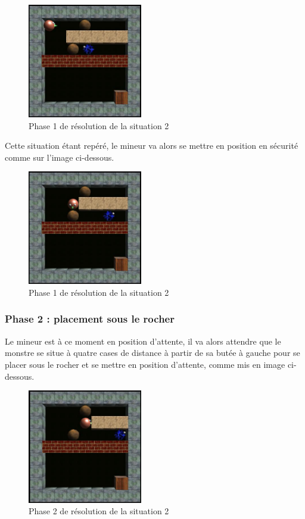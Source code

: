 \documentclass[a4paper,11pt]{article}
\begin{document}
		\begin{figure}[h]
			\center
			\includegraphics[width=5cm]{situation2-1}
			\caption{\label{situation21} Phase 1 de r\'esolution de la situation 2 }
		\end{figure}
	
Cette situation \'etant rep\'er\'e, le mineur va alors se mettre en position en s\'ecurit\'e comme sur l'image ci-dessous.
	 
		\begin{figure}[h]
			\center
			\includegraphics[width=5cm]{situation2-2}
			\caption{\label{situation22} Phase 1 de r\'esolution de la situation 2 }
		\end{figure}
	 
	 \newpage
	\subsubsection{Phase 2 : placement sous le rocher}
	
Le mineur est \`a ce moment en position d'attente, il va alors attendre que le monstre se situe \`a quatre cases de distance \`a partir de sa but\'ee \`a gauche pour se placer sous le rocher et se mettre en position d'attente, comme mis en image ci-dessous.

	\begin{figure}[h]
			\center
			\includegraphics[width=5cm]{situation2-3}
			\caption{\label{situation22} Phase 2 de r\'esolution de la situation 2 }
		\end{figure}
		
\end{document}
